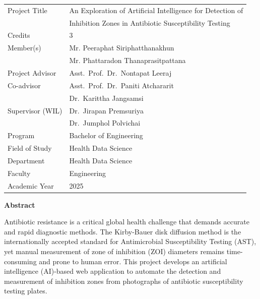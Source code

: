 
\clearpage
{}
{}

\begin{tabular}{@{}lp{10.5cm}@{}}
  Project Title   & An Exploration of Artificial Intelligence for Detection of \\
                  & Inhibition Zones in Antibiotic Susceptibility Testing \\[0.3cm]
  Credits         & 3 \\[0.2cm]
  Member(s)       & Mr. Peeraphat Siriphatthanakhun \\
                  & Mr. Phattaradon Thanaprasitpattana \\[0.3cm]
  Project Advisor & Asst.\ Prof.\ Dr.\ Nontapat Leeraj \\[0.2cm]
  Co-advisor      & Asst.\ Prof.\ Dr.\ Paniti Atchararit \\
                  & Dr.\ Karittha Jangsamsi \\[0.2cm]
  Supervisor (WIL)& Dr.\ Jirapan Premsuriya \\
                  & Dr.\ Jumphol Polvichai \\[0.3cm]
  Program         & Bachelor of Engineering \\[0.1cm]
  Field of Study  & Health Data Science \\[0.1cm]
  Department      & Health Data Science \\[0.1cm]
  Faculty         & Engineering \\[0.1cm]
  Academic Year   & 2025 \\
\end{tabular}

\vspace{1cm}
\begin{center}\textbf{Abstract}\end{center}

\hspace{\parindent}%
Antibiotic resistance is a critical global health challenge that demands accurate and rapid diagnostic methods.
The Kirby-Bauer disk diffusion method is the internationally accepted standard for Antimicrobial Susceptibility Testing (AST),
yet manual measurement of zone of inhibition (ZOI) diameters remains time-consuming and prone to human error.
This project develops an artificial intelligence (AI)-based web application to automate the detection
and measurement of inhibition zones from photographs of antibiotic susceptibility testing plates.

